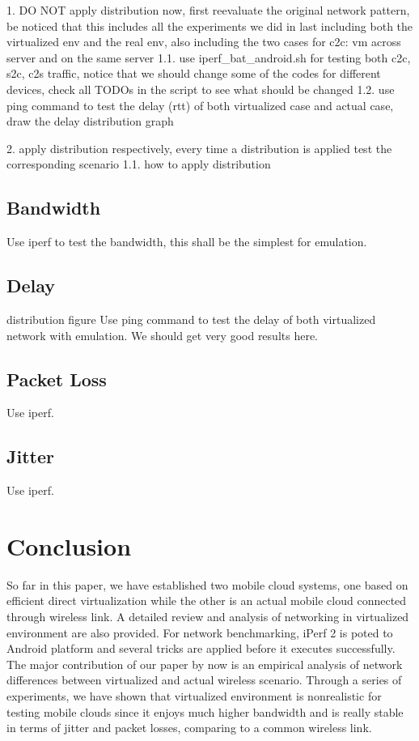 \documentclass[journal,comsoc]{IEEEtran}
\begin{document}
1. DO NOT apply distribution now, first reevaluate the original network pattern, be noticed that this includes all the experiments we did in last including both the virtualized env and the real env, also including the two cases for c2c: vm across server and on the same server
	1.1. use iperf_bat_android.sh for testing both c2c, s2c, c2s traffic, notice that we should change  some of the codes for different devices, check all TODOs in the script to see what should be changed
	1.2. use ping command to test the delay (rtt) of both virtualized case and actual case, draw the delay distribution graph
	
2. apply distribution respectively, every time a distribution is applied test the corresponding scenario
	1.1. how to apply distribution

\subsection{Bandwidth}
Use iperf to test the bandwidth, this shall be the simplest for emulation.

\subsection{Delay}
distribution figure
Use ping command to test the delay of both virtualized network with emulation. We should get very good results here. 

\subsection{Packet Loss}
Use iperf. 

\subsection{Jitter}
Use iperf. 

\section{Conclusion}
So far in this paper, we have established two mobile cloud systems, one based on efficient direct virtualization while the other is an actual mobile cloud connected through wireless link. A detailed review and analysis of networking in virtualized environment are also provided.  For network benchmarking, iPerf 2 is poted to Android platform and several tricks are applied before it executes successfully. The major contribution of our paper by now is an empirical analysis of network differences between virtualized and actual wireless scenario. Through a series of experiments, we have shown that virtualized environment is nonrealistic for testing mobile clouds since it enjoys much higher bandwidth and is really stable in terms of jitter and packet losses, comparing to a common wireless link.
\end{document}
